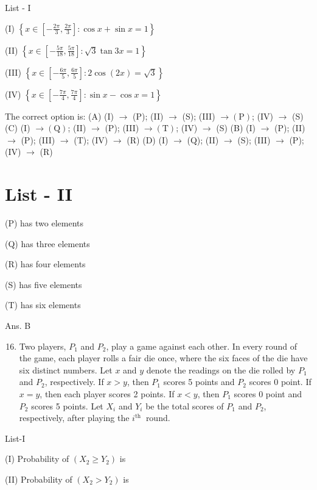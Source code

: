 \documentclass[10pt]{article}
\begin{document}
List - I

(I) $\left\{x \in\left[-\frac{2 \pi}{3}, \frac{2 \pi}{3}\right]: \cos x+\sin x=1\right\}$

(II) $\left\{x \in\left[-\frac{5 \pi}{18}, \frac{5 \pi}{18}\right]: \sqrt{3} \tan 3 x=1\right\}$

(III) $\left\{x \in\left[-\frac{6 \pi}{5}, \frac{6 \pi}{5}\right]: 2 \cos (2 x)=\sqrt{3}\right\}$

(IV) $\left\{x \in\left[-\frac{7 \pi}{4}, \frac{7 \pi}{4}\right]: \sin x-\cos x=1\right\}$

The correct option is:
(A) (I) $\rightarrow$ (P); (II) $\rightarrow$ (S); (III) $\rightarrow(\mathrm{P})$; (IV) $\rightarrow$ (S)
(C) (I) $\rightarrow(\mathrm{Q})$; (II) $\rightarrow$ (P); (III) $\rightarrow(\mathrm{T})$; (IV) $\rightarrow$ (S)
(B) (I) $\rightarrow$ (P); (II) $\rightarrow$ (P); (III) $\rightarrow$ (T); (IV) $\rightarrow$ (R)
(D) (I) $\rightarrow$ (Q); (II) $\rightarrow$ (S); (III) $\rightarrow$ (P); (IV) $\rightarrow$ (R)

\section{List - II}
(P) has two elements

(Q) has three elements

(R) has four elements

(S) has five elements

(T) has six elements

Ans. B

\begin{enumerate}
  \setcounter{enumi}{15}
  \item Two players, $P_{1}$ and $P_{2}$, play a game against each other. In every round of the game, each player rolls a fair die once, where the six faces of the die have six distinct numbers. Let $x$ and $y$ denote the readings on the die rolled by $P_{1}$ and $P_{2}$, respectively. If $x>y$, then $P_{1}$ scores 5 points and $P_{2}$ scores 0 point. If $x=y$, then each player scores 2 points. If $x<y$, then $P_{1}$ scores 0 point and $P_{2}$ scores 5 points. Let $X_{i}$ and $Y_{i}$ be the total scores of $P_{1}$ and $P_{2}$, respectively, after playing the $i^{\text {th }}$ round.
\end{enumerate}

List-I

(I) Probability of $\left(X_{2} \geq Y_{2}\right)$ is

(II) Probability of $\left(X_{2}>Y_{2}\right)$ is
\end{document}
